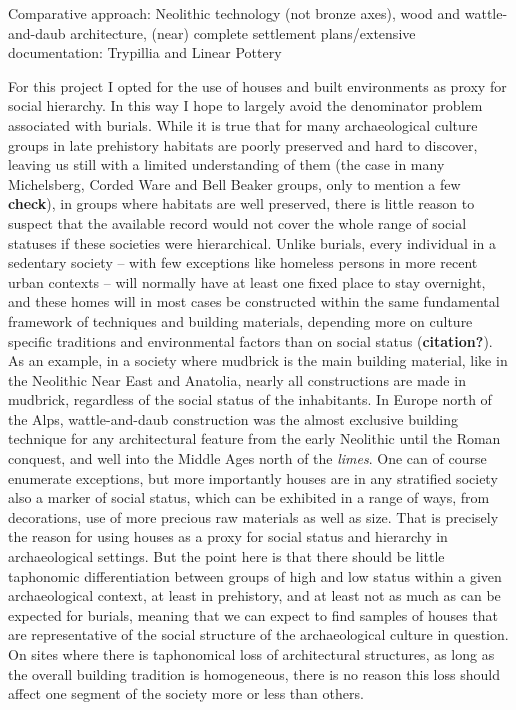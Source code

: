 \documentclass[
  12pt,
]{book}
\begin{document}
Comparative approach: Neolithic technology (not bronze axes), wood and wattle-and-daub architecture, (near) complete settlement plans/extensive documentation: Trypillia and Linear Pottery

For this project I opted for the use of houses and built environments as proxy for social hierarchy. In this way I hope to largely avoid the denominator problem associated with burials. While it is true that for many archaeological culture groups in late prehistory habitats are poorly preserved and hard to discover, leaving us still with a limited understanding of them (the case in many Michelsberg, Corded Ware and Bell Beaker groups, only to mention a few \textbf{check}), in groups where habitats are well preserved, there is little reason to suspect that the available record would not cover the whole range of social statuses if these societies were hierarchical. Unlike burials, every individual in a sedentary society -- with few exceptions like homeless persons in more recent urban contexts -- will normally have at least one fixed place to stay overnight, and these homes will in most cases be constructed within the same fundamental framework of techniques and building materials, depending more on culture specific traditions and environmental factors than on social status (\textbf{citation?}). As an example, in a society where mudbrick is the main building material, like in the Neolithic Near East and Anatolia, nearly all constructions are made in mudbrick, regardless of the social status of the inhabitants. In Europe north of the Alps, wattle-and-daub construction was the almost exclusive building technique for any architectural feature from the early Neolithic until the Roman conquest, and well into the Middle Ages north of the \emph{limes}. One can of course enumerate exceptions, but more importantly houses are in any stratified society also a marker of social status, which can be exhibited in a range of ways, from decorations, use of more precious raw materials as well as size. That is precisely the reason for using houses as a proxy for social status and hierarchy in archaeological settings. But the point here is that there should be little taphonomic differentiation between groups of high and low status within a given archaeological context, at least in prehistory, and at least not as much as can be expected for burials, meaning that we can expect to find samples of houses that are representative of the social structure of the archaeological culture in question. On sites where there is taphonomical loss of architectural structures, as long as the overall building tradition is homogeneous, there is no reason this loss should affect one segment of the society more or less than others.
\end{document}
